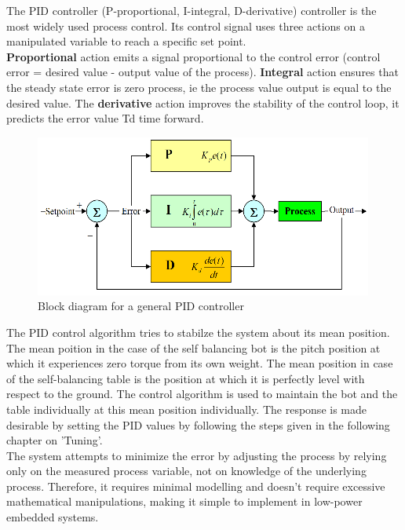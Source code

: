 The PID controller (P-proportional,  I-integral, D-derivative) controller is the most widely used process control. Its control signal uses three actions on a manipulated variable to reach a specific set point.\\

\textbf{Proportional} action emits a signal proportional to the control error (control error = desired value - output value of the process).\newline
\textbf{Integral} action ensures that the steady state error is zero process, ie the process value output is equal to the desired value.\newline
The \textbf{derivative} action improves the stability of the control loop, it predicts the error value Td time forward.\\

\begin{figure}[H]
\centering
\includegraphics{images/pid}
\caption{Block diagram for a general PID controller}
\label{fig:pid}
\end{figure}

\clearpage

The PID control algorithm tries to stabilze the system about its mean position. The mean poition in the case of the self balancing bot is the pitch position at which it experiences zero torque from its own weight. The mean position in case of the self-balancing table is the position at which it is perfectly level with respect to the ground. The control algorithm is used to maintain the bot and the table individually at this mean position individually.
The response is made desirable by setting the PID values by following the steps given in the following chapter on 'Tuning'. \\

The system attempts to minimize the error by adjusting the process by relying only on the measured process variable, not on knowledge of the underlying process. Therefore, it requires minimal modelling and doesn't require excessive mathematical manipulations, making it simple to implement in low-power embedded systems.
